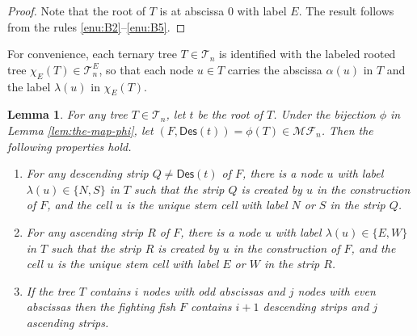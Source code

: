 \documentclass[a4paper,11pt,reqno]{amsart}
\newtheorem{lem}{Lemma}[section]
\theoremstyle{definition}
\numberwithin{equation}{section}
\newcommand{\Des}{{\textsf{Des}}}
\newcommand{\MF}{{\mathcal{MF}}}
\newcommand{\T}{{\mathcal{T}}}
\begin{document}
\begin{proof} Note that the root of $T$ is at abscissa 0 with label $E$. The result follows from the rules \ref{enu:B2}--\ref{enu:B5}.
\end{proof}

For convenience, each ternary tree $T\in\T_n$ is identified with the labeled rooted tree $\chi_E(T)\in\T^E_n$, so that  each node $u\in T$ carries the abscissa $\alpha(u)$ in $T$ and the label $\lambda(u)$ in $\chi_E(T)$.


\begin{lem}  \label{lem:unique-stem-cell-in-strips}
For any tree $T\in\T_n$, let $t$ be the root of $T$. Under the bijection $\phi$ in Lemma \ref{lem:the-map-phi}, let $(F,\Des(t))=\phi(T)\in\MF_n$. Then the following properties hold.
\begin{enumerate}
\item For any descending strip $Q\neq \Des(t)$ of $F$, there is a node $u$ with label $\lambda(u)\in\{N,S\}$ in $T$ such that the strip $Q$ is created by $u$ in the construction of $F$, and the cell $u$ is the unique stem cell with label $N$ or $S$ in the strip $Q$.
\item For any ascending strip $R$ of $F$, there is a node $u$ with label $\lambda(u)\in\{E,W\}$ in $T$ such that the strip $R$ is created by $u$ in the construction of $F$, and the cell $u$ is the unique stem cell with label $E$ or $W$ in the strip $R$.
\item If the tree $T$ contains $i$ nodes with odd abscissas and $j$ nodes with even abscissas then the fighting fish $F$ contains $i+1$ descending strips and $j$ ascending strips.
\end{enumerate}
\end{lem}
\end{document}
